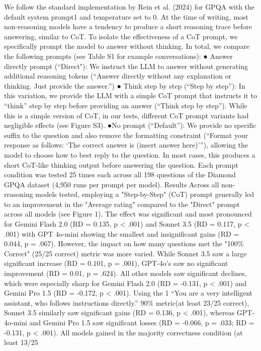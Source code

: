 We follow the standard implementation by Rein et al. (2024) for GPQA with the default system
prompt1  and temperature set to 0. At the time of writing, most non-reasoning models have a
tendency to produce a short reasoning trace before answering, similar to CoT. To isolate the
effectiveness of a CoT prompt, we specifically prompt the model to answer without thinking. In
total, we compare the following prompts (see Table S1 for example conversations):
●​ Answer directly prompt (“Direct"): We instruct the LLM to answer without generating
additional reasoning tokens (“Answer directly without any explanation or thinking. Just
provide the answer.”)
●​ Think step by step (“Step by step”): In this variation, we provide the LLM with a
simple CoT prompt that instructs it to “think” step by step before providing an answer
(“Think step by step”).  While this is a simple version of CoT, in our tests, different CoT
prompt variants had negligible effects (see Figure S3).
●​ No prompt (“Default”): We provide no specific suffix to the question and also remove
the formatting constraint (“Format your response as follows: ‘The correct answer is
(insert answer here)’”), allowing the model to choose how to best reply to the question. In
most cases, this produces a short CoT-like thinking output before answering the
question.
Each prompt condition was tested 25 times each across all 198 questions of the Diamond
GPQA dataset (4,950 runs per prompt per model).
Results
Across all non-reasoning models tested, employing a "Step-by-Step" (CoT) prompt generally led
to an improvement in the "Average rating" compared to the "Direct" prompt across all models
(see Figure 1). The effect was significant and most pronounced for Gemini Flash 2.0 (RD =
0.135, p < .001) and Sonnet 3.5 (RD = 0.117, p < .001) with GPT 4o-mini showing the smallest
and insignificant gains (RD = 0.044, p = .067). However, the impact on how many questions met
the "100\% Correct" (25/25 correct) metric was more varied. While Sonnet 3.5 saw a large
significant increase (RD = 0.101, p = .001), GPT-4o’s saw no significant improvement (RD =
0.01, p = .624). All other models saw significant declines, which were especially sharp for
Gemini Flash 2.0 (RD = -0.131, p < .001) and Gemini Pro 1.5 (RD = -0.172, p < .001). Using the
1 “You are a very intelligent assistant, who follows instructions directly.”
90\% metric(at least 23/25 correct), Sonnet 3.5 similarly saw significant gains (RD = 0.136, p <
.001), whereas GPT-4o-mini and Gemini Pro 1.5 saw significant losses (RD = -0.066, p = .033;
RD = -0.131, p < .001). All models gained in the majority correctness condition (at least 13/25
